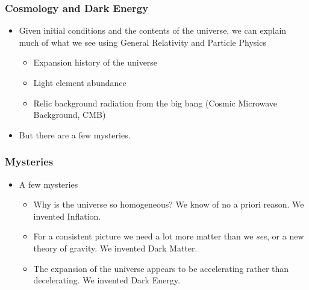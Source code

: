\documentclass{beamer}
\begin{document}
\frame
{
    \frametitle{Cosmology and Dark Energy}


    \begin{itemize}

        \item Given initial conditions and the contents of the universe,
            we can explain much of what we see using General Relativity
            and Particle Physics

        \begin{itemize}
                
            \item Expansion history of the universe

            \item Light element abundance

            \item Relic background radiation from the big bang
                (Cosmic Microwave Background, CMB)

        \end{itemize}

    \item But there are a few mysteries.

    \end{itemize}
}

\frame
{
    \frametitle{Mysteries}


    \begin{itemize}

        \item A few mysteries

        \begin{itemize}
                
            \item Why is the universe so homogeneous?  We know of no a priori 
                reason.  We invented {\color{gold} Inflation}.

            \item For a consistent picture we need a lot more matter than we {\it see},
                or a new theory of gravity.  We invented {\color{gold} Dark Matter}.

            \item The expansion of the universe appears to be accelerating
                rather than decelerating.  We invented {\color{gold} Dark Energy}.

        \end{itemize}

    \end{itemize}
}
\end{document}
